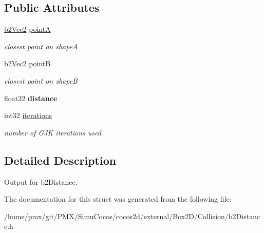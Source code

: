 \subsection*{Public Attributes}
\begin{DoxyCompactItemize}
\item 
\mbox{\label{structb2DistanceOutput_a7e0f1f44a64e596dc7d37570c69eefce}} 
\hyperlink{structb2Vec2}{b2\+Vec2} \hyperlink{structb2DistanceOutput_a7e0f1f44a64e596dc7d37570c69eefce}{pointA}
\begin{DoxyCompactList}\small\item\em closest point on shapeA \end{DoxyCompactList}\item 
\mbox{\label{structb2DistanceOutput_aa85beca17337a506cd4a924d0c6f92cc}} 
\hyperlink{structb2Vec2}{b2\+Vec2} \hyperlink{structb2DistanceOutput_aa85beca17337a506cd4a924d0c6f92cc}{pointB}
\begin{DoxyCompactList}\small\item\em closest point on shapeB \end{DoxyCompactList}\item 
\mbox{\label{structb2DistanceOutput_ae67f480ff37d4ab732e6366f485c7f55}} 
float32 {\bfseries distance}
\item 
\mbox{\label{structb2DistanceOutput_ae2d4c84dd3d05ea4f4d20c91099ec8d5}} 
int32 \hyperlink{structb2DistanceOutput_ae2d4c84dd3d05ea4f4d20c91099ec8d5}{iterations}
\begin{DoxyCompactList}\small\item\em number of G\+JK iterations used \end{DoxyCompactList}\end{DoxyCompactItemize}


\subsection{Detailed Description}
Output for b2\+Distance. 

The documentation for this struct was generated from the following file\+:\begin{DoxyCompactItemize}
\item 
/home/pmx/git/\+P\+M\+X/\+Simu\+Cocos/cocos2d/external/\+Box2\+D/\+Collision/b2\+Distance.\+h\end{DoxyCompactItemize}
